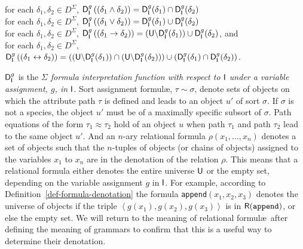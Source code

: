 \documentclass[output=paper
                ,modfonts
                ,nonflat
	        ,collection
	        ,collectionchapter
	        ,collectiontoclongg
 	        ,biblatex
                ,babelshorthands
                ,newtxmath
                ,draftmode
                ,colorlinks, citecolor=brown
]{./langsci/langscibook}
\begin{document}
{{\begin{mydef}
\hspace*{.5cm} for each $\delta_1, \delta_2\in D^{\Sigma}$,
$\mathsf{D}_{\mathsf{I}}^g\left((\delta_1\land\delta_2)\right)=\mathsf{D}_{\mathsf{I}}^g(\delta_1)\cap\mathsf{D}_{\mathsf{I}}^g(\delta_2)$\\
\hspace*{.5cm} for each $\delta_1, \delta_2\in D^{\Sigma}$,
$\mathsf{D}_{\mathsf{I}}^g\left((\delta_1\lor\delta_2)\right)=\mathsf{D}_{\mathsf{I}}^g(\delta_1)\cup\mathsf{D}_{\mathsf{I}}^g(\delta_2)$\\
\hspace*{.5cm} for each $\delta_1, \delta_2\in D^{\Sigma}$,
$\mathsf{D}_{\mathsf{I}}^g\left((\delta_1\rightarrow\delta_2)\right)=\left(\mathsf{U}\backslash\mathsf{D}_{\mathsf{I}}^g(\delta_1)\right)\cup\mathsf{D}_{\mathsf{I}}^g(\delta_2)$, 
and\\
\hspace*{.5cm} for each $\delta_1, \delta_2\in D^{\Sigma}$,\\
\hspace*{.75cm}$\mathsf{D}_{\mathsf{I}}^g\left((\delta_1\leftrightarrow\delta_2)\right)=
((\mathsf{U}\backslash\mathsf{D}_{\mathsf{I}}^g(\delta_1))\cap
(\mathsf{U}\backslash\mathsf{D}_{\mathsf{I}}^g(\delta_2)))\cup
(\mathsf{D}_{\mathsf{I}}^g(\delta_1)\cap\mathsf{D}_{\mathsf{I}}^g(\delta_2))$.
\end{mydef}

$\mathsf{D}_{\mathsf{I}}^g$ is the \emph{$\Sigma$ formula interpretation function with
  respect to $\mathsf{I}$ under a variable assignment, $g$, in $\mathsf{I}$}.
Sort assignment formul\ae, $\tau\sim\sigma$, denote sets of objects on
which the attribute path $\tau$ is defined and leads to an object $u'$
of sort $\sigma$. If $\sigma$ is not a species, the object $u'$ must
be of a maximally specific subsort of $\sigma$. Path equations of the
form $\tau_1 \approx \tau_2$ hold of an object $u$ when path
$\tau_1$ and path $\tau_2$ lead to the same object $u'$. And an
$n$-ary relational formula $\rho(x_1,\ldots,x_n)$ denotes a set of
objects such that the $n$-tuples of objects (or chains of objects)
assigned to the variables $x_1$ to $x_n$ are in the denotation of the
relation $\rho$. This means that a relational formula either denotes
the entire universe $\mathsf{U}$ or the empty set, depending on the
variable assignment $g$ in $\mathsf{I}$. For example, according to
Definition~\ref{def-formula-denotation} the formula
\texttt{append}$(x_1, x_2, x_3)$ denotes the universe of objects
if the triple $\left<g(x_1), g(x_2), g(x_3)\right>$ is in
$\mathsf{R}(\texttt{append})$, or else the empty set. We will return to the
meaning of relational formul\ae\ after defining the meaning of grammars
to confirm that this is a useful way to determine their denotation.

}}
\end{document}
